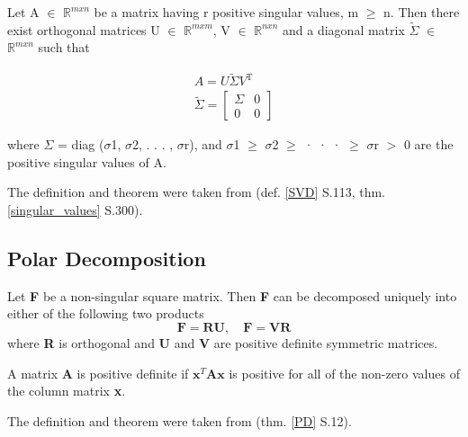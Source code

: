 \begin{theorem}
\label{SVD}
Let A $\in$ $\mathbb{R}^{m x n}$ be a matrix having r positive singular values, m $\geq$ n. Then there exist orthogonal matrices U $\in$ $\mathbb{R}^{m x m}$, V $\in$ $\mathbb{R}^{n x n}$ and a diagonal matrix $\tilde{\Sigma}$ $\in$ $\mathbb{R}^{m x n}$ such that

\[
\begin{array}{l}{A=U \tilde{\Sigma} V^{\mathrm{T}}} \\ {\tilde{\Sigma}=\left[\begin{array}{ll}{\Sigma} & {0} \\ {0} & {0}\end{array}\right]}\end{array}
\]

where $\Sigma$ = diag ($\sigma$1, $\sigma$2, . . . , $\sigma$r), and $\sigma$1 $\geq$ $\sigma$2 $\geq$ · · · $\geq$ $\sigma$r $>$ 0 are the positive singular values of A.

\end{theorem}
The definition and theorem were taken from \cite{ford2014numerical} (def. \ref{SVD} S.113, thm. \ref{singular_values} S.300).




\subsection{Polar Decomposition}

\begin{theorem}
\label{PD}

Let \textbf{F} be a non-singular square matrix. Then \textbf{F} can be decomposed uniquely into either of the following two products
\[
\boldsymbol{F} = \boldsymbol{RU}, \quad \boldsymbol{F} = \boldsymbol{VR}
\]
where \textbf{R} is orthogonal and \textbf{U} and \textbf{V} are positive definite symmetric matrices.
\end{theorem}

A matrix \textbf{A} is positive definite if $\textbf{x}^{T}\textbf{Ax}$ is positive for all of the non-zero values of the column matrix \textbf{x}.

The definition and theorem were taken from \cite{Spencer1980} (thm. \ref{PD} S.12).





